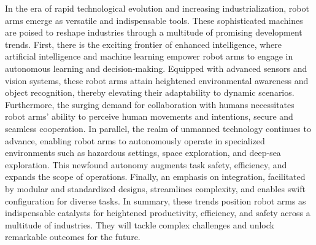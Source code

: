 In the era of rapid technological evolution and increasing industrialization, robot arms emerge as versatile and indispensable tools. These sophisticated machines are poised to reshape industries through a multitude of promising development trends. First, there is the exciting frontier of enhanced intelligence, where artificial intelligence and machine learning empower robot arms to engage in autonomous learning and decision-making. Equipped with advanced sensors and vision systems, these robot arms attain heightened environmental awareness and object recognition, thereby elevating their adaptability to dynamic scenarios. Furthermore, the surging demand for collaboration with humans necessitates robot arms' ability to perceive human movements and intentions, secure and seamless cooperation. In parallel, the realm of unmanned technology continues to advance, enabling robot arms to autonomously operate in specialized environments such as hazardous settings, space exploration, and deep-sea exploration. This newfound autonomy augments task safety, efficiency, and expands the scope of operations. Finally, an emphasis on integration, facilitated by modular and standardized designs, streamlines complexity, and enables swift configuration for diverse tasks. In summary, these trends position robot arms as indispensable catalysts for heightened productivity, efficiency, and safety across a multitude of industries. They will tackle complex challenges and unlock remarkable outcomes for the future.